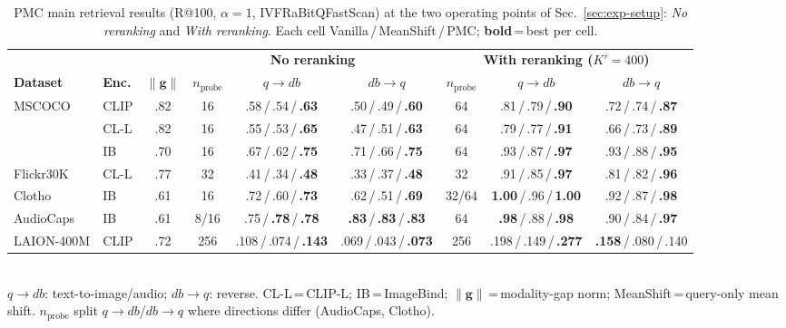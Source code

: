 \begin{table}[t]
\caption{PMC main retrieval results (R@100, $\alpha{=}1$, IVFRaBitQFastScan) at the two operating points of Sec.~\ref{sec:exp-setup}: \emph{No reranking} and \emph{With reranking}. Each cell Vanilla\,/\,MeanShift\,/\,PMC; \textbf{bold}\,=\,best per cell.}\label{tab:mainresults}
\centering
{\small
\begin{tabular*}{\textwidth}{@{\extracolsep{\fill}}llc ccc ccc@{}}
\toprule
 & & & \multicolumn{3}{c}{\textbf{No reranking}} & \multicolumn{3}{c}{\textbf{With reranking ($K'{=}400$)}} \\
\cmidrule(lr){4-6}\cmidrule(lr){7-9}
\textbf{Dataset} & \textbf{Enc.} & $\|\mathbf{g}\|$ & $n_\mathrm{probe}$ & $q{\to}db$ & $db{\to}q$ & $n_\mathrm{probe}$ & $q{\to}db$ & $db{\to}q$ \\
\midrule
MSCOCO    & CLIP  & .82 & 16 & .58\,/\,.54\,/\,\textbf{.63} & .50\,/\,.49\,/\,\textbf{.60} & 64 & .81\,/\,.79\,/\,\textbf{.90} & .72\,/\,.74\,/\,\textbf{.87} \\
          & CL-L  & .82 & 16 & .55\,/\,.53\,/\,\textbf{.65} & .47\,/\,.51\,/\,\textbf{.63} & 64 & .79\,/\,.77\,/\,\textbf{.91} & .66\,/\,.73\,/\,\textbf{.89} \\
          & IB    & .70 & 16 & .67\,/\,.62\,/\,\textbf{.75} & .71\,/\,.66\,/\,\textbf{.75} & 64 & .93\,/\,.87\,/\,\textbf{.97} & .93\,/\,.88\,/\,\textbf{.95} \\
Flickr30K & CL-L  & .77 & 32 & .41\,/\,.34\,/\,\textbf{.48} & .33\,/\,.37\,/\,\textbf{.48} & 32 & .91\,/\,.85\,/\,\textbf{.97} & .81\,/\,.82\,/\,\textbf{.96} \\
Clotho    & IB    & .61 & 16 & .72\,/\,.60\,/\,\textbf{.73} & .62\,/\,.51\,/\,\textbf{.69} & 32/64 & \textbf{1.00}\,/\,.96\,/\,\textbf{1.00} & .92\,/\,.87\,/\,\textbf{.98} \\
AudioCaps & IB    & .61 & 8/16 & .75\,/\,\textbf{.78}\,/\,\textbf{.78} & \textbf{.83}\,/\,\textbf{.83}\,/\,\textbf{.83} & 64 & \textbf{.98}\,/\,.88\,/\,\textbf{.98} & .90\,/\,.84\,/\,\textbf{.97} \\
LAION-400M & CLIP & .72 & 256 & .108\,/\,.074\,/\,\textbf{.143} & .069\,/\,.043\,/\,\textbf{.073} & 256 & .198\,/\,.149\,/\,\textbf{.277} & \textbf{.158}\,/\,.080\,/\,.140 \\
\bottomrule
\end{tabular*}
}\\[1pt]
{\footnotesize $q{\to}db$: text-to-image/audio; $db{\to}q$: reverse. CL-L\,=\,CLIP-L; IB\,=\,ImageBind; $\|\mathbf{g}\|$\,=\,modality-gap norm; MeanShift\,=\,query-only mean shift. $n_\mathrm{probe}$ split $q{\to}db$/$db{\to}q$ where directions differ (AudioCaps, Clotho).}
\end{table}

